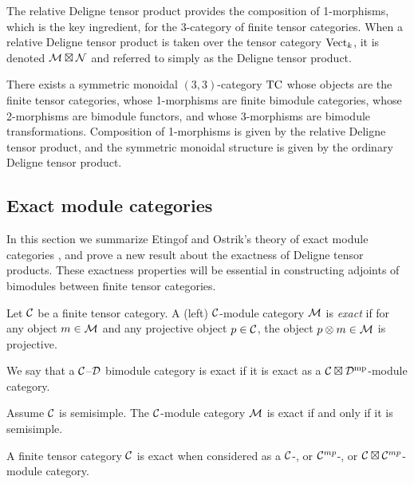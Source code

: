 \documentclass{amsart}
\begin{document}
The relative Deligne tensor product provides the composition of 1-morphisms, which is the key ingredient, for the 3-category of finite tensor categories.  When a relative Deligne tensor product is taken over the tensor category $\mathrm{Vect}_k$, it is denoted $\mathcal M \boxtimes \mathcal N$ and referred to simply as the Deligne tensor product.

\begin{theorem}[\cite{3TC}]
	There exists a symmetric monoidal $(3,3)$-category $\mathrm{TC}$ whose objects are the finite tensor categories, whose 1-morphisms are finite bimodule categories, whose 2-morphisms are bimodule functors, and whose 3-morphisms are bimodule transformations. Composition of 1-morphisms is given by the relative Deligne tensor product, and the symmetric monoidal structure is given by the ordinary Deligne tensor product. 
\end{theorem}

\subsection{Exact module categories} \label{sec:tc-exact}
In this section we summarize Etingof and Ostrik's theory of exact module categories \cite{EO-ftc}, and prove a new result about the exactness of Deligne tensor products.  These exactness properties will be essential in constructing adjoints of bimodules between finite tensor categories.

\begin{definition}
	Let $\mathcal C$ be a finite tensor category. A (left) $\mathcal C$-module category $\mathcal M$ is {\em exact} if for any object $m \in \mathcal M$ and  any projective object $p \in \mathcal C$, the object $p \otimes m \in \mathcal M$ is projective. 
\end{definition}

\begin{definition}
We say that a $\mathcal C$--$\mathcal D$ bimodule category is exact if it is exact as a $\mathcal C \boxtimes \mathcal D^{\mathrm{mp}}$-module category.
\end{definition}


\begin{example}
	Assume $\mathcal C$ is semisimple.  The $\mathcal C$-module category $\mathcal M$ is exact if and only if it is semisimple.
\end{example} %

\begin{example} \label{ex:exactness}
	A finite tensor category $\mathcal C$ is exact when considered as a $\mathcal C$-, or $\mathcal C^{mp}$-, or $\mathcal C \boxtimes \mathcal C^{mp}$-module category. 
\end{example} %
\end{document}
